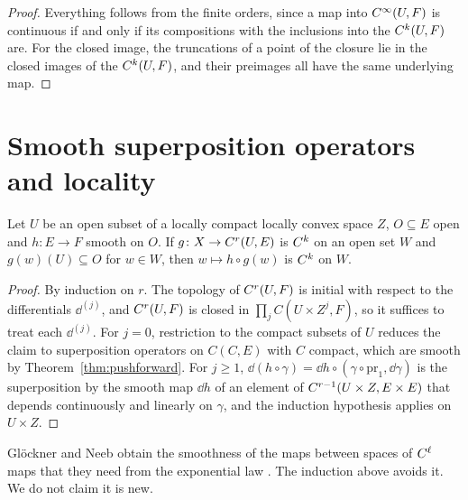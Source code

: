 \begin{proof}
  \leanok
  Everything follows from the finite orders, since a map into $C^{\infty}(U, F)$ is continuous
  if and only if its compositions with the inclusions into the $C^{k}(U, F)$ are. For the
  closed image, the truncations of a point of the closure lie in the closed images of the
  $C^{k}(U, F)$, and their preimages all have the same underlying map.
\end{proof}

\section{Smooth superposition operators and locality}
\label{sec:ck-superposition-smooth}

\begin{theorem}
  \label{thm:ck-superposition-smooth}
  \leanok
  Let $U$ be an open subset of a locally compact locally convex space $Z$, $O \subseteq E$ open and
  $h \colon E \to F$ smooth on $O$. If $g \colon X \to C^{r}(U, E)$ is $C^{k}$ on an open set
  $W$ and $g(w)(U) \subseteq O$ for $w \in W$, then $w \mapsto h \circ g(w)$ is $C^{k}$ on $W$.
\end{theorem}

\begin{proof}
  \leanok
  By induction on $r$. The topology of $C^{r}(U, F)$ is initial with respect to the
  differentials $\dd^{(j)}$, and $C^{r}(U, F)$ is closed in $\prod_j C(U \times Z^j, F)$, so it
  suffices to treat each $\dd^{(j)}$. For $j = 0$, restriction to the compact subsets of $U$
  reduces the claim to superposition operators on $C(C, E)$ with $C$ compact, which are smooth
  by Theorem~\ref{thm:pushforward}. For $j \ge 1$, $\dd(h \circ \gamma) = \dd h \circ (\gamma \circ
  \mathrm{pr}_1, \dd\gamma)$ is the superposition by the smooth map $\dd h$ of an element of
  $C^{r-1}(U \times Z, E \times E)$ that depends continuously and linearly on $\gamma$, and the
  induction hypothesis applies on $U \times Z$.
\end{proof}

\begin{remark}
  Glöckner and Neeb obtain the smoothness of the maps between spaces of $C^{\ell}$ maps that they
  need from the exponential law \cite[Proposition~4.1.34]{GN26}. The induction above avoids it. We
  do not claim it is new.
\end{remark}


